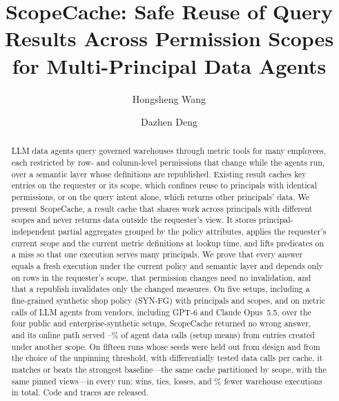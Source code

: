 \documentclass[sigconf, nonacm]{acmart}
\begin{document}
\title[ScopeCache: Safe Reuse of Query Results Across Permission Scopes]{ScopeCache: Safe Reuse of Query Results Across Permission Scopes for Multi-Principal Data Agents}

\author{Hongsheng Wang}

\author{Dazhen Deng}

\renewcommand{\shortauthors}{Wang and Deng}

\begin{abstract}
LLM data agents query governed warehouses through metric tools for many employees, each restricted by row- and column-level permissions that change while the agents run, over a semantic layer whose definitions are republished. Existing result caches key entries on the requester or its scope, which confines reuse to principals with identical permissions, or on the query intent alone, which returns other principals' data. We present ScopeCache, a result cache that shares work across principals with different scopes and never returns data outside the requester's view. It stores principal-independent partial aggregates grouped by the policy attributes, applies the requester's current scope and the current metric definitions at lookup time, and lifts predicates on a miss so that one execution serves many principals. We prove that every answer equals a fresh execution under the current policy and semantic layer and depends only on rows in the requester's scope, that permission changes need no invalidation, and that a republish invalidates only the changed measures. On five setups, including a fine-grained synthetic shop policy (SYN-FG) with \synfgUsers{} principals and \synfgScopes{} scopes, and on \nAgentCalls{} metric calls of \nModelsWord{} LLM agents from \nVendorsWord{} vendors, including GPT-6 and Claude Opus~5.5, over the four public and enterprise-synthetic setups, ScopeCache returned no wrong answer, and its online path served \agentXscopeMeanLo--\agentXscopeMeanHi\% of agent data calls (setup means) from entries created under another scope. On fifteen runs whose seeds were held out from design and from the choice of the unpinning threshold, with \freshDataCalls{} differentially tested data calls per cache, it matches or beats the strongest baseline---the same cache partitioned by scope, with the same pinned views---in every run: \psvW{} wins, \psvT{} ties, \psvL{} losses, and \freshRedTot\% fewer warehouse executions in total. Code and traces are released.
\end{abstract}
\end{document}
